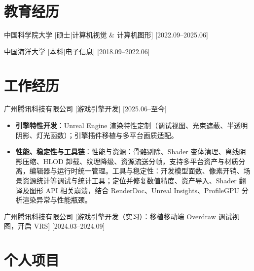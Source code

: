 \documentclass{resume}
\begin{document}

\ResumeTitle

\section{教育经历} %

\ResumeItem
{中国科学院大学}
[\textnormal{硕士|计算机视觉 \& 计算机图形}]
[2022.09--2025.06]

\ResumeItem
{中国海洋大学}
[\textnormal{本科|电子信息}]
[2018.09--2022.06]

\section{工作经历}

\ResumeItem
{广州腾讯科技有限公司}
[游戏引擎开发]
[2025.06--至今]
\begin{itemize}
\item \textbf{引擎特性开发}：Unreal Engine 渲染特性定制（调试视图、光束遮蔽、半透明阴影、灯光函数）；引擎插件移植与多平台画质适配。
\item \textbf{性能、稳定性与工具链}：性能与资源：骨骼剔除、Shader 变体清理、离线阴影压缩、HLOD 卸载、纹理降级、资源流送分帧，支持多平台资产与材质分离，编辑器与运行时统一管理。工具与稳定性：开发模型面数、像素开销、场景资源统计等调试与统计工具；定位并修复数值精度、资产导入、Shader 翻译及图形 API 相关崩溃，结合 RenderDoc、Unreal Insights、ProfileGPU 分析渲染异常与性能瓶颈。
\end{itemize}

\ResumeItem
{广州腾讯科技有限公司} %
[游戏引擎开发（实习）：移植移动端 Overdraw 调试视图，开启 VRS]
[2024.03--2024.09]

\section{个人项目} %
\end{document}
